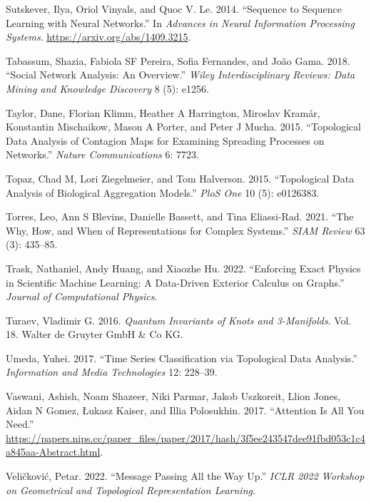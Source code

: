 \documentclass[
  12pt,
]{krantz}
\newlength{\cslhangindent}
\newenvironment{CSLReferences}[2] %
 {\begin{list}{}{%
  \setlength{\itemindent}{0pt}
  \setlength{\leftmargin}{0pt}
  \setlength{\parsep}{0pt}
  \ifodd #1
   \setlength{\leftmargin}{\cslhangindent}
   \setlength{\itemindent}{-1\cslhangindent}
  \fi
  \setlength{\itemsep}{#2\baselineskip}}}
 {\end{list}}
\begin{document}
\begin{CSLReferences}{1}{0}
Sutskever, Ilya, Oriol Vinyals, and Quoc V. Le. 2014. {``Sequence to
Sequence Learning with Neural Networks.''} In \emph{Advances in Neural
Information Processing Systems}. \url{https://arxiv.org/abs/1409.3215}.

Tabassum, Shazia, Fabiola SF Pereira, Sofia Fernandes, and João Gama.
2018. {``Social Network Analysis: An Overview.''} \emph{Wiley
Interdisciplinary Reviews: Data Mining and Knowledge Discovery} 8 (5):
e1256.

Taylor, Dane, Florian Klimm, Heather A Harrington, Miroslav Kramár,
Konstantin Mischaikow, Mason A Porter, and Peter J Mucha. 2015.
{``Topological Data Analysis of Contagion Maps for Examining Spreading
Processes on Networks.''} \emph{Nature Communications} 6: 7723.

Topaz, Chad M, Lori Ziegelmeier, and Tom Halverson. 2015. {``Topological
Data Analysis of Biological Aggregation Models.''} \emph{PloS One} 10
(5): e0126383.

Torres, Leo, Ann S Blevins, Danielle Bassett, and Tina Eliassi-Rad.
2021. {``The Why, How, and When of Representations for Complex
Systems.''} \emph{SIAM Review} 63 (3): 435--85.

Trask, Nathaniel, Andy Huang, and Xiaozhe Hu. 2022. {``Enforcing Exact
Physics in Scientific Machine Learning: A Data-Driven Exterior Calculus
on Graphs.''} \emph{Journal of Computational Physics}.

Turaev, Vladimir G. 2016. \emph{Quantum Invariants of Knots and
3-Manifolds}. Vol. 18. Walter de Gruyter GmbH \& Co KG.

Umeda, Yuhei. 2017. {``Time Series Classification via Topological Data
Analysis.''} \emph{Information and Media Technologies} 12: 228--39.

Vaswani, Ashish, Noam Shazeer, Niki Parmar, Jakob Uszkoreit, Llion
Jones, Aidan N Gomez, Łukasz Kaiser, and Illia Polosukhin. 2017.
{``Attention Is All You Need.''}
\url{https://papers.nips.cc/paper_files/paper/2017/hash/3f5ee243547dee91fbd053c1c4a845aa-Abstract.html}.

Veličković, Petar. 2022. {``Message Passing All the Way Up.''}
\emph{ICLR 2022 Workshop on Geometrical and Topological Representation
Learning}.


\end{CSLReferences}
\end{document}
